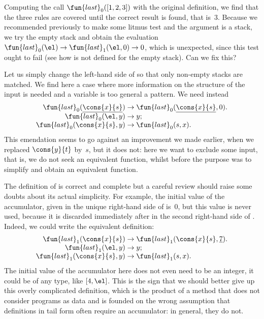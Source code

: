 Computing the call \(\fun{last}_0([1,2,3])\) with the original
definition, we find that the three rules are covered until the correct
result is found, that is~\(3\). Because we recommended previously to
make some litmus test and the argument is a stack, we try the empty
stack and obtain the evaluation \(\fun{last}_0(\el) \rightarrow
\fun{last}_1(\el,0) \rightarrow 0\), which is unexpected, since this
test ought to fail (see how  is not defined for the empty
stack). Can we fix this?

Let us simply change the left\hyp{}hand side of  so
that only non\hyp{}empty stacks are matched. We find here a case where
more information on the structure of the input is needed and a
variable is too general a pattern. We need instead
\begin{equation*}
\begin{array}{r@{\;}c@{\;}l}
\fun{last}_0(\underline{\cons{x}{s}}) & \rightarrow &
  \fun{last}_0(\underline{\cons{x}{s}},0).\\
\fun{last}_0(\el,y) & \rightarrow & y;\\
\fun{last}_0(\cons{x}{s},y) & \rightarrow & \fun{last}_0(s,x).
\end{array}
\end{equation*}
This emendation seems to go against an improvement we made earlier,
when we replaced \(\cons{y}{t}\) by~\(s\), but it does not: here we
want to exclude some input, that is, we do not seek an equivalent
function, whilst before the purpose was to simplify and obtain an
equivalent function.

The definition of  is correct and complete but a
careful review should raise some doubts about its actual
simplicity. For example, the initial value of the accumulator, given
in the unique right\hyp{}hand side of  is~\(0\), but
this value is never used, because it is discarded immediately after in
the second right\hyp{}hand side of . Indeed, we
could write the equivalent definition:
\begin{equation*}
\begin{array}{r@{\;}c@{\;}l}
\fun{last}_1(\cons{x}{s}) & \rightarrow & \fun{last}_1(\cons{x}{s},\underline{7}).\\
\fun{last}_1(\el,y) & \rightarrow & y;\\
\fun{last}_1(\cons{x}{s},y) & \rightarrow & \fun{last}_1(s,x).
\end{array}
\end{equation*}
The initial value of the accumulator here does not even need to be an
integer, it could be of any type, like \([4,\el]\). This is the sign
that we should better give up this overly complicated definition,
which is the product of a method that does not consider programs as
data and is founded on the wrong assumption that definitions in tail
form often require an accumulator: in general, they do not.


